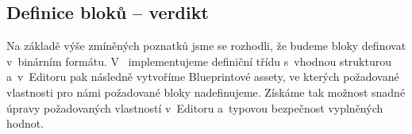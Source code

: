 \subsection{Definice bloků -- verdikt}

Na základě výše zmíněných poznatků jsme se rozhodli, že budeme bloky definovat v~binárním formátu. V~\CPP{} implementujeme definiční třídu s~vhodnou strukturou a~v~Editoru pak následně vytvoříme Blueprintové assety, ve kterých požadované vlastnosti pro námi požadované bloky nadefinujeme. Získáme tak možnost snadné úpravy požadovaných vlastností v~Editoru a~typovou bezpečnost vyplněných hodnot.